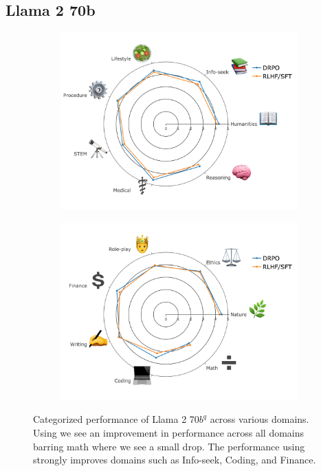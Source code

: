 \newpage
\subsection{Llama 2 70b}
\begin{figure}[h]
\centering
\begin{subfigure}[b]{.5\textwidth}
  \centering
  \includegraphics[width=0.95\linewidth]{images/llama_1.png}
  \label{fig:cat_llama_1}
\end{subfigure}%

\vspace{1em}

\begin{subfigure}[b]{.5\textwidth}
  \centering
  \includegraphics[width=0.95\linewidth]{images/llama_2.png}
  \label{fig:cat_llama_2}
\end{subfigure}
\caption{Categorized performance of Llama 2 70$b^q$ across various domains. Using \ours we see an improvement in performance across all domains barring math where we see a small drop. The performance using \ours strongly improves domains such as Info-seek, Coding, and Finance.  }
\label{fig:categorized_performance_llama}
\end{figure}

